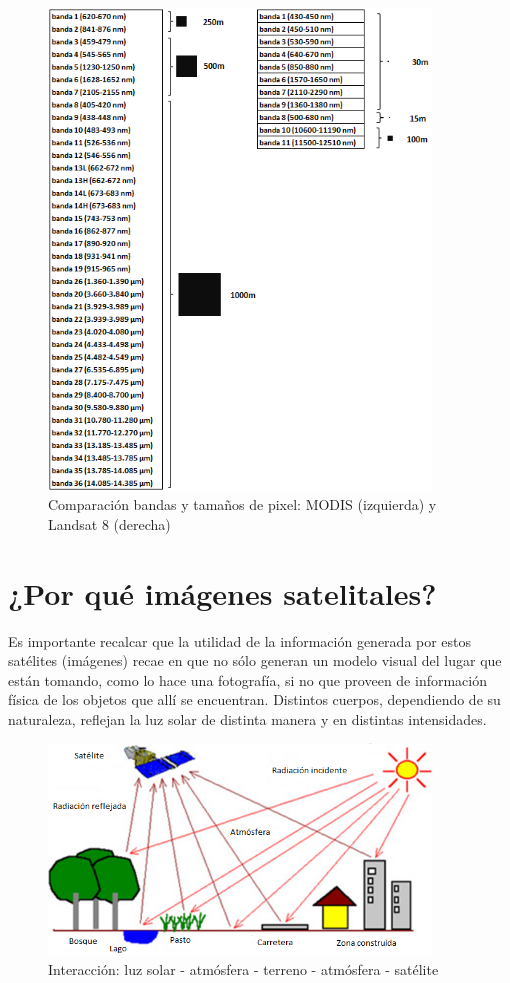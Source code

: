 \documentclass[11pt,spanish]{article}
\begin{document}
\begin{figure}[h!]
\centering
\includegraphics[width=4in]{2_bandas_modis_landsat.png}
\caption{Comparación bandas y tamaños de pixel: MODIS (izquierda) y Landsat 8 (derecha)}
\end{figure}

\newpage

\section{¿Por qué imágenes satelitales?}

Es importante recalcar que la utilidad de la información generada por estos satélites (imágenes) recae en que no sólo generan un modelo visual del lugar que están tomando, como lo hace una fotografía, si no que proveen de información física de los objetos que allí se encuentran. Distintos cuerpos, dependiendo de su naturaleza, reflejan la luz solar de distinta manera y en distintas intensidades.

\begin{figure}[h!]
\centering
\includegraphics[width=4in]{3_sol_satelites.png}
\caption{Interacción: luz solar - atmósfera - terreno - atmósfera - satélite}
\end{figure}
\end{document}
